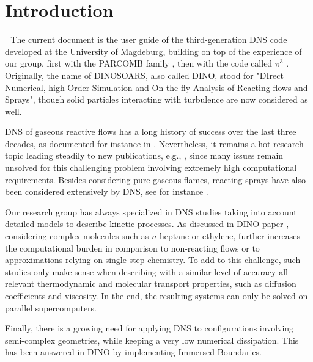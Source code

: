 \section{Introduction} 
\label{Introduction} 
The current document is the user guide of the third-generation DNS code developed at the University of Magdeburg, building on top of the experience of our group, first with the PARCOMB family \cite{Parcomb,Hilbert}, then with the code called $\pi^{3}$ \cite{pi3,pi32}. Originally, the name of DINOSOARS, also called DINO, stood for "DIrect Numerical, high-Order Simulation and On-the-fly Analysis of Reacting flows and Sprays", though solid particles interacting with turbulence are now considered as well.

DNS of gaseous reactive flows has a long history of success over the last three decades, as documented for instance in \cite{oran1987, reynolds1990, poinsot1991, Baum1994, poinsot1996, vervisch1998, thevenin1995,thevenin2005}. Nevertheless, it remains a hot research topic leading steadily to new publications, e.g., \cite{hawkes2007, coussement2013,Bansal2015, Bhagatwala2015}, since many issues remain unsolved for this challenging problem involving extremely high computational requirements. Besides considering pure gaseous flames, reacting sprays have also been considered extensively by DNS, see for instance \cite{Duret2013, Komori2014}.

Our research group has always specialized in DNS studies taking into account detailed models to describe kinetic processes. As discussed in DINO paper \cite{dinosoars2015}, considering complex molecules such as $n$-heptane or ethylene,  further increases the computational burden in comparison to non-reacting flows or to approximations relying on single-step chemistry. To add to this challenge, such studies only make sense when describing with a similar level of accuracy all relevant thermodynamic and molecular transport properties, such as diffusion coefficients and viscosity. In the end, the resulting systems can only be solved on parallel supercomputers.

Finally, there is a growing need for applying DNS to configurations involving semi-complex geometries, while keeping a very low numerical dissipation. This has been answered in DINO by implementing Immersed Boundaries.

